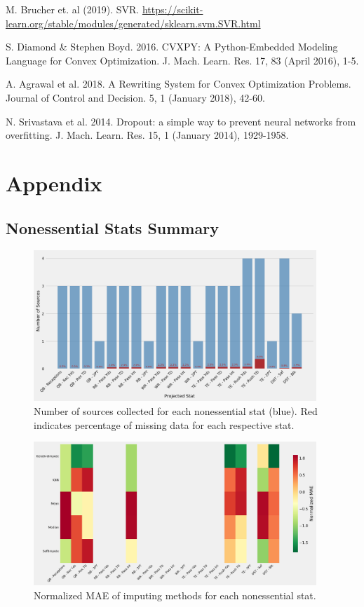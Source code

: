 \documentclass[12pt]{article}
\begin{document}
\begin{thebibliography}{}
M. Brucher et. al (2019). 
SVR. \url{https://scikit-learn.org/stable/modules/generated/sklearn.svm.SVR.html}

S. Diamond \& Stephen Boyd. 2016. {CVXPY}: A {P}ython-Embedded Modeling Language for Convex Optimization. J. Mach. Learn. Res. 17, 83 (April 2016), 1-5.

A. Agrawal et al. 2018. A Rewriting System for Convex Optimization Problems. Journal of Control and Decision. 5, 1 (January 2018), 42-60.

N. Srivastava et al. 2014. Dropout: a simple way to prevent neural networks from overfitting. J. Mach. Learn. Res. 15, 1 (January 2014), 1929-1958.


\end{thebibliography}

\pagebreak
\section{Appendix}
\subsection{Nonessential Stats Summary}

\begin{figure}[H]
  \centering
  \includegraphics[width=0.95\textwidth]{../figures/nonessential_missing_data}
  \caption{Number of sources collected for each nonessential stat (blue). Red  indicates percentage of missing data for each respective stat.}
\end{figure}

\begin{figure}[H]
  \centering
  \includegraphics[width=0.95\textwidth]{../figures/nonessential_impute_MAE}
  \caption{Normalized MAE of imputing methods for each nonessential stat.}
\end{figure}
\end{document}

